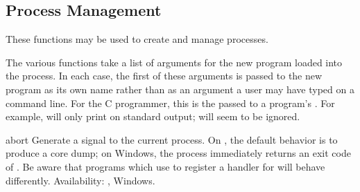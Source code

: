 \subsection{Process Management \label{os-process}}

These functions may be used to create and manage processes.

The various  functions take a list of arguments for
the new program loaded into the process.  In each case, the first of
these arguments is passed to the new program as its own name rather
than as an argument a user may have typed on a command line.  For the
C programmer, this is the  passed to a program's
.  For example,  will only print  on standard output; 
will seem to be ignored.


\begin{funcdesc}{abort}{}
Generate a  signal to the current process.  On
\UNIX, the default behavior is to produce a core dump; on Windows, the
process immediately returns an exit code of .  Be aware that
programs which use  to register a handler
for  will behave differently.
Availability: \UNIX, Windows.
\end{funcdesc}

